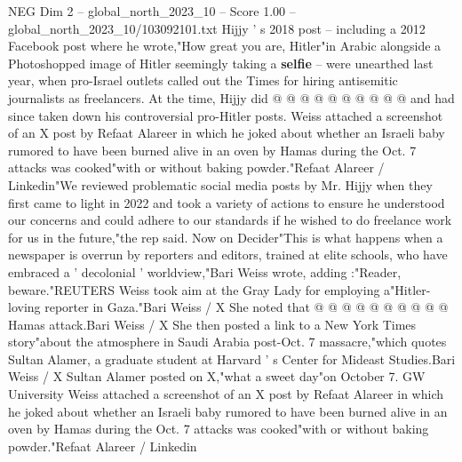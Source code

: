 \begin{textsample}{NEG Dim 2 – global\_north\_2023\_10 – Score 1.00 – global\_north\_2023\_10/103092101.txt}
Hijjy ' s 2018 post -- including a 2012 Facebook post where he wrote,"How great you are, Hitler"in Arabic alongside a Photoshopped image of Hitler seemingly taking a \textbf{selfie} -- were unearthed last year, when pro-Israel outlets called out the Times for hiring antisemitic journalists as freelancers.
At the time, Hijjy did @ @ @ @ @ @ @ @ @ @ and had since taken down his controversial pro-Hitler posts.
Weiss attached a screenshot of an X post by Refaat Alareer in which he joked about whether an Israeli baby rumored to have been burned alive in an oven by Hamas during the Oct. 7 attacks was cooked"with or without baking powder."Refaat Alareer / Linkedin"We reviewed problematic social media posts by Mr.
Hijjy when they first came to light in 2022 and took a variety of actions to ensure he understood our concerns and could adhere to our standards if he wished to do freelance work for us in the future,"the rep said.
Now on Decider"This is what happens when a newspaper is overrun by reporters and editors, trained at elite schools, who have embraced a ' decolonial ' worldview,"Bari Weiss wrote, adding :"Reader, beware."REUTERS Weiss took aim at the Gray Lady for employing a"Hitler-loving reporter in Gaza."Bari Weiss / X She noted that @ @ @ @ @ @ @ @ @ @ Hamas attack.Bari Weiss / X She then posted a link to a New York Times story"about the atmosphere in Saudi Arabia post-Oct. 7 massacre,"which quotes Sultan Alamer, a graduate student at Harvard ' s Center for Mideast Studies.Bari Weiss / X Sultan Alamer posted on X,"what a sweet day"on October 7.
GW University Weiss attached a screenshot of an X post by Refaat Alareer in which he joked about whether an Israeli baby rumored to have been burned alive in an oven by Hamas during the Oct. 7 attacks was cooked"with or without baking powder."Refaat Alareer / Linkedin

\end{textsample}
